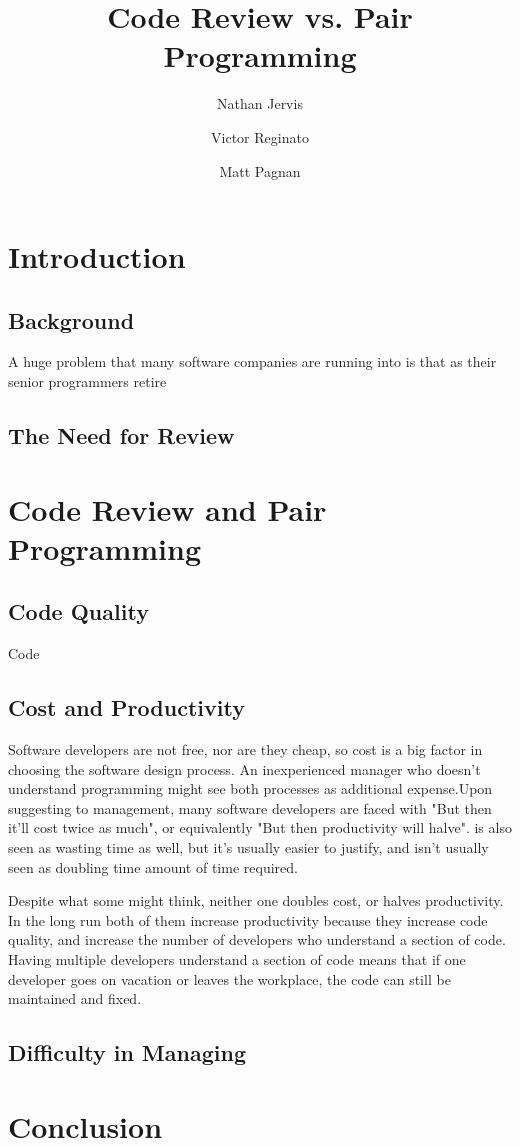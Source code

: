 \documentclass{article}
\title{Code Review vs. Pair Programming}
\author{Nathan Jervis \and Victor Reginato \and Matt Pagnan}
\begin{document}
\maketitle

\section{Introduction}

\subsection{Background}
A huge problem that many software companies are running into is that as their senior programmers retire  

\subsection{The Need for Review}

\section{Code Review and Pair Programming}

\subsection{Code Quality}

Code

\subsection{Cost and Productivity}

Software developers are not free, nor are they cheap, so cost is a big factor in choosing the software design process. An inexperienced manager who doesn't understand programming might see both processes as additional expense.Upon suggesting \PP to management, many software developers are faced with "But then it'll cost twice as much", or equivalently "But then productivity will halve". \CR is also seen as wasting time as well, but it's usually easier to justify, and isn't usually seen as doubling time amount of time required.

Despite what some might think, neither one doubles cost, or halves productivity. In the long run both of them increase productivity because they increase code quality, and increase the number of developers who understand a section of code. Having multiple developers understand a section of code means that if one developer goes on vacation or leaves the workplace, the code can still be maintained and fixed.

\subsection{Difficulty in Managing}

\section{Conclusion}
\end{document}
